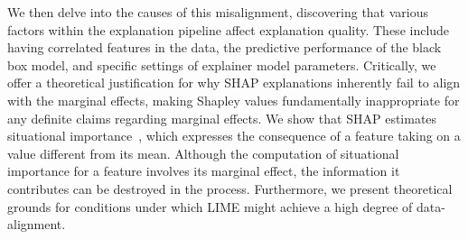 \documentclass[12pt]{article}  %
\begin{document}
We then delve into the causes of this misalignment, discovering that various factors within the explanation pipeline affect explanation quality. These include having correlated features in the data, the predictive performance of the black box model, and specific settings of explainer model parameters. %
Critically, we offer a theoretical justification for why SHAP explanations inherently fail to align with the marginal effects, making Shapley values fundamentally inappropriate for any definite claims regarding marginal effects. We show that SHAP estimates situational importance~\citep{StrumbeljErik2014Epma}, 
 which expresses the consequence of a feature taking on a value different from its mean. Although the computation of situational importance for a feature involves its marginal effect, the information it contributes can be destroyed in the process. Furthermore, we present theoretical grounds for conditions under which LIME might achieve a high degree of data-alignment.


\end{document}
